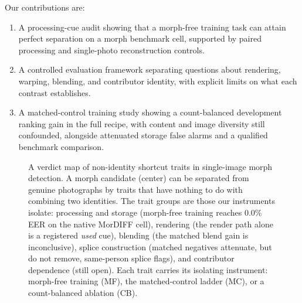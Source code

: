 \documentclass[10pt,twocolumn,letterpaper]{article}
\begin{document}
Our contributions are:
\begin{enumerate}
\item A processing-cue audit showing that a morph-free training task can attain perfect separation on a morph benchmark cell, supported by paired processing and single-photo reconstruction controls.
\item A controlled evaluation framework separating questions about rendering, warping, blending, and contributor identity, with explicit limits on what each contrast establishes.
\item A matched-control training study showing a count-balanced development ranking gain in the full recipe, with content and image diversity still confounded, alongside attenuated storage false alarms and a qualified benchmark comparison.
\end{enumerate}

%

\begin{figure}[tbp]
\centering

\caption{A verdict map of non-identity shortcut traits in single-image morph detection. A morph candidate (center) can be separated from genuine photographs by traits that have nothing to do with combining two identities. The trait groups are those our instruments isolate: processing and storage (morph-free training reaches 0.0\% EER on the native MorDIFF cell), rendering (the render path alone is a registered \emph{used} cue), blending (the matched blend gain is inconclusive), splice construction (matched negatives attenuate, but do not remove, same-person splice flags), and contributor dependence (still open). Each trait carries its isolating instrument: morph-free training (MF), the matched-control ladder (MC), or a count-balanced ablation (CB).}
\label{fig:shortcuts_overview}
\end{figure}
%



\end{document}
